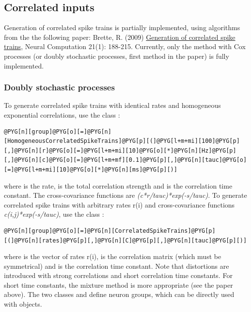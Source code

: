 \documentclass[letterpaper,10pt,english]{manual}
\begin{document}
\subsection{Correlated inputs}

Generation of correlated spike trains is partially implemented, using algorithms from the
the following paper: Brette, R. (2009) \href{http://www.di.ens.fr/~brette/papers/Brette2008NC.html}{Generation of correlated spike trains},
Neural Computation 21(1): 188-215. Currently, only the method with Cox processes
(or doubly stochastic processes, first method in the paper) is fully implemented.


\subsubsection{Doubly stochastic processes}

To generate correlated spike trains with identical rates and homogeneous exponential correlations,
use the class :

\begin{Verbatim}[commandchars=@\[\]]
@PYG[n][group]@PYG[o][=]@PYG[n][HomogeneousCorrelatedSpikeTrains]@PYG[p][(]@PYG[l+m+mi][100]@PYG[p][,]@PYG[n][r]@PYG[o][=]@PYG[l+m+mi][10]@PYG[o][*]@PYG[n][Hz]@PYG[p][,]@PYG[n][c]@PYG[o][=]@PYG[l+m+mf][0.1]@PYG[p][,]@PYG[n][tauc]@PYG[o][=]@PYG[l+m+mi][10]@PYG[o][*]@PYG[n][ms]@PYG[p][)]
\end{Verbatim}

where  is the rate,  is the total correlation strength and  is the correlation time constant.
The cross-covariance functions are \emph{(c*r/tauc)*exp(-\textbar{}s\textbar{}/tauc)}.
To generate correlated spike trains with arbitrary rates r(i) and
cross-covariance functions \emph{c(i,j)*exp(-\textbar{}s\textbar{}/tauc)}, use the class :

\begin{Verbatim}[commandchars=@\[\]]
@PYG[n][group]@PYG[o][=]@PYG[n][CorrelatedSpikeTrains]@PYG[p][(]@PYG[n][rates]@PYG[p][,]@PYG[n][C]@PYG[p][,]@PYG[n][tauc]@PYG[p][)]
\end{Verbatim}

where  is the vector of rates r(i),  is the correlation matrix (which must be
symmetrical) and  is the correlation time constant. Note that distortions are introduced
with strong correlations and short correlation time constants. For short time constants,
the mixture method is more appropriate (see the paper above).
The two classes  and 
define neuron groups, which can be directly used with \hyperlink{brian.Connection}{} objects.
\end{document}
